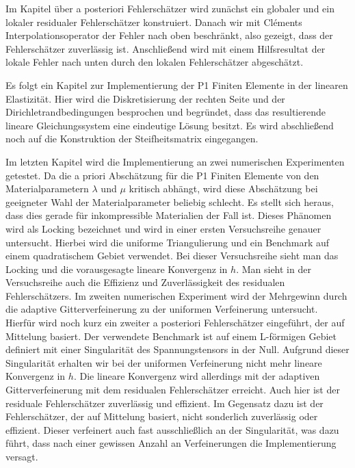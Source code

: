 \documentclass{scrartcl}
\begin{document}
Im Kapitel über a posteriori Fehlerschätzer wird zunächst ein globaler und ein lokaler residualer Fehlerschätzer konstruiert. Danach wir mit Cléments Interpolationsoperator der Fehler nach oben beschränkt, also gezeigt, dass der Fehlerschätzer zuverlässig ist. Anschließend wird mit einem Hilfsresultat der lokale Fehler nach unten durch den lokalen Fehlerschätzer abgeschätzt.

Es folgt ein Kapitel zur Implementierung der P1 Finiten Elemente in der linearen Elasti\-zität. Hier wird die Diskretisierung der rechten Seite und der Dirichletrandbedingungen besprochen und begründet, dass das resultierende lineare Gleichungssystem eine eindeutige Lösung besitzt. Es wird abschließend noch auf die Konstruktion der Steifheits\-matrix eingegangen.

Im letzten Kapitel wird die Implementierung an zwei numerischen Experimenten getestet. Da die a priori Abschätzung für die P1 Finiten Elemente von den Material\-parametern $\lambda$ und $\mu$ kritisch abhängt, wird diese Abschätzung bei geeigneter Wahl der Materialparameter beliebig schlecht. Es stellt sich heraus, dass dies gerade für inkompressible Materialien der Fall ist. Dieses Phänomen wird als Locking bezeichnet und wird in einer ersten Versuchsreihe genauer untersucht. Hierbei wird die uniforme Triangulierung und ein Benchmark auf einem quadratischem Gebiet verwendet. Bei dieser Versuchsreihe sieht man das Locking und die vorausgesagte lineare Konvergenz in $h$. Man sieht in der Versuchsreihe auch die Effizienz und Zuverlässigkeit des residualen Fehlerschätzers.
Im zweiten numerischen Experiment wird der Mehrgewinn durch die adaptive Gitterverfeinerung zu der uniformen Verfeinerung untersucht. Hierfür wird noch kurz ein zweiter a posteriori Fehlerschätzer eingeführt, der auf Mittelung basiert.
Der verwendete Benchmark ist auf einem L-förmigen Gebiet definiert mit einer Singularität des Spannungstensors in der Null. Aufgrund dieser Singularität erhalten wir bei der uniformen Verfeinerung nicht mehr lineare Konvergenz in $h$. Die lineare Konvergenz wird allerdings mit der adaptiven Gitterverfeinerung mit dem residualen Fehlerschätzer erreicht. Auch hier ist der residuale Fehlerschätzer zuverlässig und effizient. Im Gegensatz dazu ist der Fehlerschätzer, der auf Mittelung basiert, nicht sonderlich zuverlässig oder effizient. Dieser verfeinert auch fast ausschließlich an der Singularität, was dazu führt, dass nach einer gewissen Anzahl an Verfeinerungen die Implementierung versagt.
\end{document}

